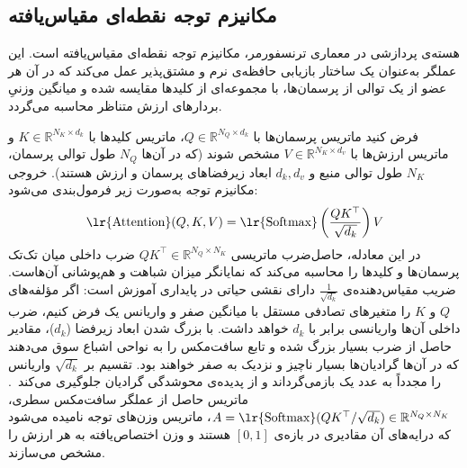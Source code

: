 \subsection{مکانیزم توجه نقطه‌ای مقیاس‌یافته}\label{sec:2-2-2}

هسته‌ی پردازشی در معماری ترنسفورمر، مکانیزم توجه نقطه‌ای مقیاس‌یافته است. این عملگر به‌عنوان یک ساختار بازیابی حافظه‌ی نرم و مشتق‌پذیر عمل می‌کند که در آن هر عضو از یک توالی از پرسمان‌ها، با مجموعه‌ای از کلیدها مقایسه شده و میانگین وزنیِ بردارهای ارزش متناظر محاسبه می‌گردد.

فرض کنید ماتریس پرسمان‌ها با $Q \in \mathbb{R}^{N_Q \times d_k}$، ماتریس کلیدها با $K \in \mathbb{R}^{N_K \times d_k}$ و ماتریس ارزش‌ها با $V \in \mathbb{R}^{N_K \times d_v}$ مشخص شوند (که در آن‌ها $N_Q$ طول توالی پرسمان، $N_K$ طول توالی منبع و $d_k, d_v$ ابعاد زیرفضاهای پرسمان و ارزش هستند). خروجی مکانیزم توجه به‌صورت زیر فرمول‌بندی می‌شود:
\begin{equation}\label{eq:chap2_attention}
    \text{\lr{Attention}}(Q, K, V) = \text{\lr{Softmax}}\left(\frac{QK^\top}{\sqrt{d_k}}\right)V
\end{equation}
در این معادله، حاصل‌ضرب ماتریسی $QK^\top \in \mathbb{R}^{N_Q \times N_K}$ ضرب داخلی میان تک‌تک پرسمان‌ها و کلیدها را محاسبه می‌کند که نمایانگر میزان شباهت و هم‌پوشانی آن‌هاست. ضریب مقیاس‌دهنده‌ی $\frac{1}{\sqrt{d_k}}$ دارای نقشی حیاتی در پایداری آموزش است: اگر مؤلفه‌های $Q$ و $K$ را متغیرهای تصادفی مستقل با میانگین صفر و واریانس یک فرض کنیم، ضرب داخلی آن‌ها واریانسی برابر با $d_k$ خواهد داشت. با بزرگ شدن ابعاد زیرفضا ($d_k$)، مقادیر حاصل از ضرب بسیار بزرگ شده و تابع سافت‌مکس را به نواحی اشباع سوق می‌دهند که در آن‌ها گرادیان‌ها بسیار ناچیز و نزدیک به صفر خواهند بود. تقسیم بر $\sqrt{d_k}$ واریانس را مجدداً به عدد یک بازمی‌گرداند و از پدیده‌ی محوشدگی گرادیان جلوگیری می‌کند~\cite{vaswani2017attention}. ماتریس حاصل از عملگر سافت‌مکس سطری، $A = \text{\lr{Softmax}}(QK^\top / \sqrt{d_k}) \in \mathbb{R}^{N_Q \times N_K}$، ماتریس وزن‌های توجه نامیده می‌شود که درایه‌های آن مقادیری در بازه‌ی $[0, 1]$ هستند و وزن اختصاص‌یافته به هر ارزش را مشخص می‌سازند.

